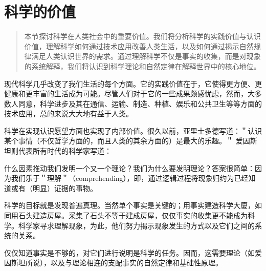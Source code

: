 \section{科学的价值}

\begin{quotation}
本节探讨科学在人类社会中的重要价值。我们将分析科学的实践价值与认识价值，理解科学如何通过技术应用改善人类生活，以及如何通过揭示自然规律满足人类认识世界的需求。通过理解科学不仅是事实的收集，而是对现象的系统解释，我们将认识到科学理论和自然定律在解释世界中的核心地位。
\end{quotation}

现代科学几乎改变了我们生活的每个方面。它的实践价值在于，它使得更方便、更健康和更丰富的生活成为可能。尽管人们对于它的一些成果颇感忧虑，然而，大多数人同意，科学进步及其在通信、运输、制造、种植、娱乐和公共卫生等等方面的技术应用，总的来说大大地有益于人类。

科学在实现认识愿望方面也实现了内部价值。很久以前，亚里士多德写道：＂认识某个事情（不仅哲学方面的，而且人类的其余方面的）是最大的乐趣。＂\cite{aristotle1950} 爱因斯坦则代表所有时代的科学家写道：

\begin{displayquote}
什么因素推动我们发明一个又一个理论？我们为什么要发明理论？答案很简单：因为我们乐于＂理解＂（comprehending），即，通过逻辑过程将现象归约为已经知道或有（明显）证据的事物。\cite{einstein1935}
\end{displayquote}

科学的目标就是发现普遍真理。当然单个事实是关键的；用事实建造科学大廈，如同用石头建造房屋。采集了石头不等于建成房屋，仅仅事实的收集更不能成为科学。科学家寻求理解现象，为此，他们努力揭示现象发生的方式以及它们之间的系统的关系。

仅仅知道事实是不够的，对它们进行说明是科学的任务。因而，这需要理论（如爱因斯坦所说），以及与理论相连的支配事实的自然定律和基础性原理。 


